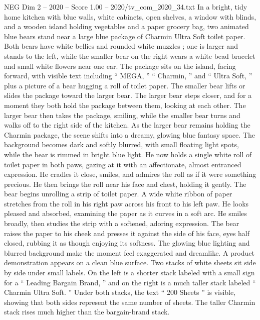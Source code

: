 \begin{textsample}{NEG Dim 2 – 2020 – Score 1.00 – 2020/tv\_com\_2020\_34.txt}  \label{ex:f2_neg_053}
In a bright, tidy home kitchen with blue walls, white cabinets, open shelves, a window with blinds, and a wooden island holding vegetables and a paper grocery bag, two animated blue bears stand near a large blue package of Charmin Ultra Soft toilet paper.
Both bears have white bellies and rounded white muzzles ; one is larger and stands to the left, while the smaller bear on the right wears a white bead bracelet and small white flowers near one ear.
The package sits on the island, facing forward, with visible text including “ MEGA, ” “ Charmin, ” and “ Ultra Soft, ” plus a picture of a bear hugging a roll of toilet paper.
The smaller bear lifts or slides the package toward the larger bear.
The larger bear steps closer, and for a moment they both hold the package between them, looking at each other.
The larger bear then takes the package, smiling, while the smaller bear turns and walks off to the right side of the kitchen.
As the larger bear remains holding the Charmin package, the scene shifts into a dreamy, glowing blue fantasy space.
The background becomes dark and softly blurred, with small floating light spots, while the bear is rimmed in bright blue light.
He now holds a single white roll of toilet paper in both paws, gazing at it with an affectionate, almost entranced expression.
He cradles it close, smiles, and admires the roll as if it were something precious.
He then brings the roll near his face and chest, holding it gently.
The bear begins unrolling a strip of toilet paper.
A wide white ribbon of paper stretches from the roll in his right paw across his front to his left paw.
He looks pleased and absorbed, examining the paper as it curves in a soft arc.
He smiles broadly, then studies the strip with a softened, adoring expression.
The bear raises the paper to his cheek and presses it against the side of his face, eyes half closed, rubbing it as though enjoying its softness.
The glowing blue lighting and blurred background make the moment feel exaggerated and dreamlike.
A product demonstration appears on a clean blue surface.
Two stacks of white sheets sit side by side under small labels.
On the left is a shorter stack labeled with a small sign for a “ Leading Bargain Brand, ” and on the right is a much taller stack labeled “ Charmin Ultra Soft. ” Under both stacks, the text “ 200 Sheets ” is visible, showing that both sides represent the same number of sheets.
The taller Charmin stack rises much higher than the bargain-brand stack.

\end{textsample}
